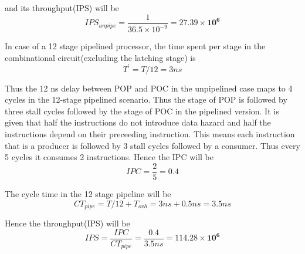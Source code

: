 \documentclass{tufte-handout}
\begin{document}
	and its throughput(IPS) will be 
	\[
		IPS_{unpipe} = \dfrac{1}{36.5 \times 10^{-9}} = \mathbf{27.39 \times 10^6}
	\]

	In case of a 12 stage pipelined processor, the time spent per stage in the combinational circuit(excluding the latching stage) is
	\[
		T^\prime = T/12 = 3ns
	\]

	Thus the 12 ns delay between POP and POC in the unpipelined case maps to 4 cycles in the 12-stage pipelined scenario. Thus the stage of POP is followed by three stall cycles followed by the stage of POC in the pipelined version. It is given that half the instructions do not introduce data hazard and half the instructions depend on their preceeding instruction. This means each instruction that is a producer is followed by 3 stall cycles followed by a consumer. Thus every 5 cycles it consumes 2 instructions. Hence the IPC will be
	\[
		IPC = \dfrac{2}{5} = 0.4
	\]

	The cycle time in the 12 stage pipeline will be
	\[
		CT_{pipe} = T/12 + T_{ovh} = 3 ns + 0.5 ns = 3.5 ns
	\]

	Hence the throughput(IPS) will be
	\[
		IPS = \dfrac{IPC}{CT_{pipe}} = \dfrac{0.4}{3.5 ns} = \mathbf{114.28 \times 10^6}
	\]


		
  
  
  
  
\end{document}
